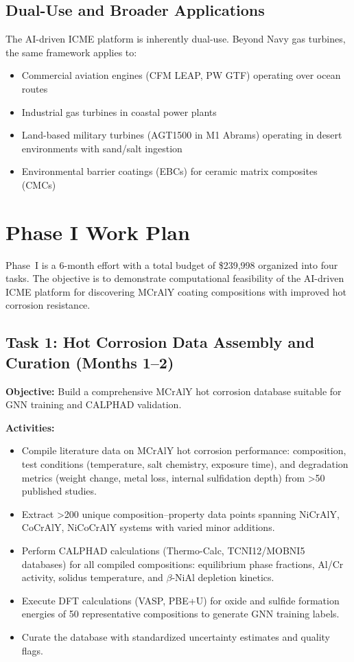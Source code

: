 \documentclass[11pt,letterpaper]{article}
\begin{document}
\subsection{Dual-Use and Broader Applications}

The AI-driven ICME platform is inherently dual-use. Beyond Navy gas turbines, the same framework applies to:
\begin{itemize}[nosep]
  \item Commercial aviation engines (CFM LEAP, PW GTF) operating over ocean routes
  \item Industrial gas turbines in coastal power plants
  \item Land-based military turbines (AGT1500 in M1 Abrams) operating in desert environments with sand/salt ingestion
  \item Environmental barrier coatings (EBCs) for ceramic matrix composites (CMCs)
\end{itemize}


\section{Phase I Work Plan}
\label{sec:workplan}

Phase~I is a 6-month effort with a total budget of \$239,998 organized into four tasks. The objective is to demonstrate computational feasibility of the AI-driven ICME platform for discovering MCrAlY coating compositions with improved hot corrosion resistance.

\subsection{Task 1: Hot Corrosion Data Assembly and Curation (Months 1--2)}

\textbf{Objective:} Build a comprehensive MCrAlY hot corrosion database suitable for GNN training and CALPHAD validation.

\textbf{Activities:}
\begin{itemize}[nosep]
  \item Compile literature data on MCrAlY hot corrosion performance: composition, test conditions (temperature, salt chemistry, exposure time), and degradation metrics (weight change, metal loss, internal sulfidation depth) from \textgreater50 published studies.
  \item Extract \textgreater200 unique composition--property data points spanning NiCrAlY, CoCrAlY, NiCoCrAlY systems with varied minor additions.
  \item Perform CALPHAD calculations (Thermo-Calc, TCNI12/MOBNI5 databases) for all compiled compositions: equilibrium phase fractions, Al/Cr activity, solidus temperature, and $\beta$-NiAl depletion kinetics.
  \item Execute DFT calculations (VASP, PBE+U) for oxide and sulfide formation energies of 50 representative compositions to generate GNN training labels.
  \item Curate the database with standardized uncertainty estimates and quality flags.
\end{itemize}
\end{document}

